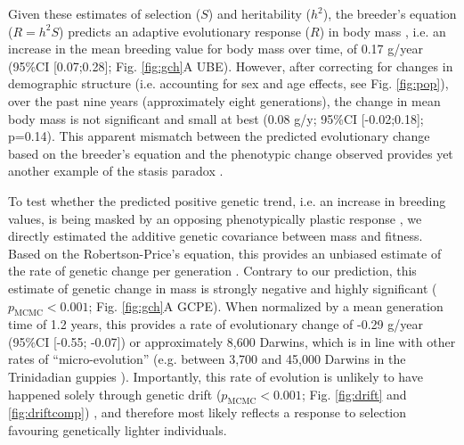 Given these estimates of selection ($S$) and heritability ($h^2$), the breeder's equation ($R=h^2S$) predicts an adaptive evolutionary response ($R$) in body mass \parencite{Lynch1998,Morrissey2012sts}, i.e. an increase in the mean breeding value for body mass over time, of 0.17 g/year (95\%CI [0.07;0.28]; Fig. \ref{fig:gch}A UBE).  However, after correcting for changes in demographic structure (i.e. accounting for sex and age effects, see Fig. \ref{fig:pop}), over the past nine years (approximately eight generations), the change in mean body mass is not significant and small at best (0.08 g/y; 95\%CI [-0.02;0.18]; p=0.14). This apparent mismatch between the predicted evolutionary change based on the breeder's equation and the phenotypic change observed provides yet another example of the stasis paradox \parencite{Merila2001}.

To test whether the predicted positive genetic trend, i.e. an increase in breeding values, is being masked by an opposing phenotypically plastic response \parencite{Merila2001,Hadfield2011}, we directly estimated the additive genetic covariance between mass and fitness. Based on the Robertson-Price's equation, this provides an unbiased estimate of the rate of genetic change per generation \parencite{Robertson1966,Price1970,Morrissey2012sts}. Contrary to our prediction, this estimate of genetic change in mass is strongly negative and highly significant ($p_\mathrm{MCMC}<0.001$; Fig. \ref{fig:gch}A GCPE). When normalized by a mean generation time of 1.2 years, this provides a rate of evolutionary change of -0.29 g/year (95\%CI [-0.55; -0.07]) or approximately 8,600 Darwins, which is in line with other rates of ``micro-evolution'' (e.g. between 3,700 and 45,000 Darwins in the Trinidadian guppies \parencite{Reznick1997}). Importantly, this rate of evolution is unlikely to have happened solely through genetic drift ($p_\mathrm{MCMC}<0.001$; Fig. \ref{fig:drift} and \ref{fig:driftcomp}) \parencite{Hadfield2010b}, and therefore most likely reflects a response to selection favouring genetically lighter individuals. 

